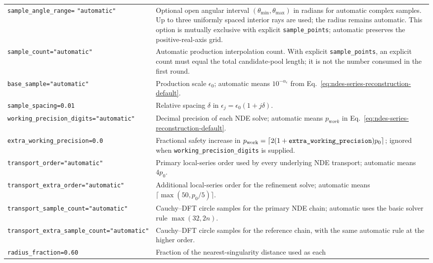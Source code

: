\documentclass[11pt]{article}
\newcommand{\eps}{\epsilon}
\begin{document}
\begin{longtable}{L{0.36\textwidth}L{0.58\textwidth}}
\texttt{sample\_angle\_range=}
\newline\texttt{"automatic"} & Optional open angular interval $(\theta_{\min},\theta_{\max})$
in radians for automatic complex samples.  Up to three uniformly spaced interior rays are used;
the radius remains automatic.  This option is mutually exclusive with explicit
\texttt{sample\_points}; automatic preserves the positive-real-axis grid. \\
\texttt{sample\_count="automatic"} & Automatic production interpolation count.  With explicit
\texttt{sample\_points}, an explicit count must equal the total candidate-pool length; it is not
the number consumed in the first round. \\
\texttt{base\_sample="automatic"} & Production scale $\eps_0$; automatic means
$10^{-\alpha_\eps}$ from Eq.~\eqref{eq:ndes-series-reconstruction-default}. \\
\texttt{sample\_spacing=0.01} & Relative spacing $\delta$ in
$\eps_j=\eps_0(1+j\delta)$. \\
\texttt{working\_precision\_}\newline\texttt{digits="automatic"} & Decimal precision of each NDE solve;
automatic means $p_{\mathrm work}$ in
Eq.~\eqref{eq:ndes-series-reconstruction-default}. \\
\texttt{extra\_working\_precision=0.0} & Fractional safety increase in
$p_{\rm work}=\lceil2(1+\texttt{extra\_working\_precision})p_0\rceil$; ignored when
\texttt{working\_precision\_digits} is supplied. \\
\texttt{transport\_order="automatic"} & Primary local-series order used by every underlying
NDE transport; automatic means $4p_0$. \\
\texttt{transport\_extra\_}\newline\texttt{order="automatic"} & Additional local-series order for the
refinement solve; automatic means $\lceil\max(50,p_0/5)\rceil$. \\
\texttt{transport\_sample\_}\newline\texttt{count="automatic"} & Cauchy--DFT circle samples
for the primary NDE chain; automatic uses the basic solver rule $\max(32,2n)$. \\
\texttt{transport\_extra\_}\newline\texttt{sample\_count="automatic"} & Cauchy--DFT circle
samples for the reference chain, with the same automatic rule at the higher order. \\
\texttt{radius\_fraction=0.60} & Fraction of the nearest-singularity distance used as each

\end{longtable}
\end{document}
